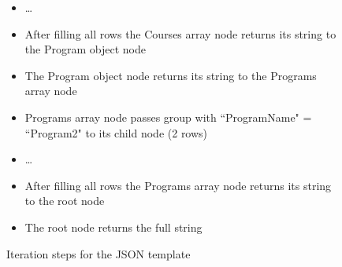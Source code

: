 \begin{figure}[]
\begin{mdframed}
\begin{itemize}
            \item \dots
            \item After filling all rows the Courses array node returns its string to the Program object node
            \item The Program object node returns its string to the Programs array node
            \item Programs array node passes group with ``ProgramName" = ``Program2" to its child node (2 rows)
            \item \dots
            \item After filling all rows the Programs array node returns its string to the root node
            \item The root node returns the full string
        \end{itemize}
    \end{mdframed}
    \caption{Iteration steps for the JSON template}
    \label{itemize:json_iteration}
\end{figure}
